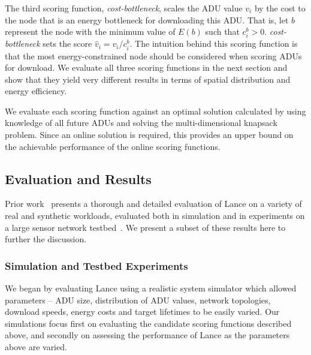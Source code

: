 The third scoring function, {\em cost-bottleneck}, scales the ADU value $v_i$
by the cost to the node that is an energy bottleneck for downloading this
ADU. That is, let $b$ represent the node with the minimum value of $E(b)$
such that $c_i^b > 0$. {\em cost-bottleneck} sets the score $\hat{v}_i = v_i
/ c_i^b$. The intuition behind this scoring function is that the most
energy-constrained node should be considered when scoring ADUs for download.
We evaluate all three scoring functions in the next section and show that
they yield very different results in terms of spatial distribution and energy
efficiency.

We evaluate each scoring function against an optimal solution calculated by
using knowledge of all future ADUs and solving the multi-dimensional knapsack
problem. Since an online solution is required, this provides an upper bound on
the achievable performance of the online scoring functions.

\subsection{Evaluation and Results}
\label{subsec-evaluationandresults}

Prior work~\cite{lance-sensys08} presents a thorough and detailed evaluation
of Lance on a variety of real and synthetic workloads, evaluated both in
simulation and in experiments on a large sensor network
testbed~\cite{motelab}.  We present a subset of these results here to further
the discussion.

\subsubsection{Simulation and Testbed Experiments}

We began by evaluating Lance using a realistic system simulator which allowed
parameters -- ADU size, distribution of ADU values, network topologies,
download speeds, energy costs and target lifetimes to be easily varied. Our
simulations focus first on evaluating the candidate scoring functions described
above, and secondly on assessing the performance of Lance as the parameters
above are varied.

